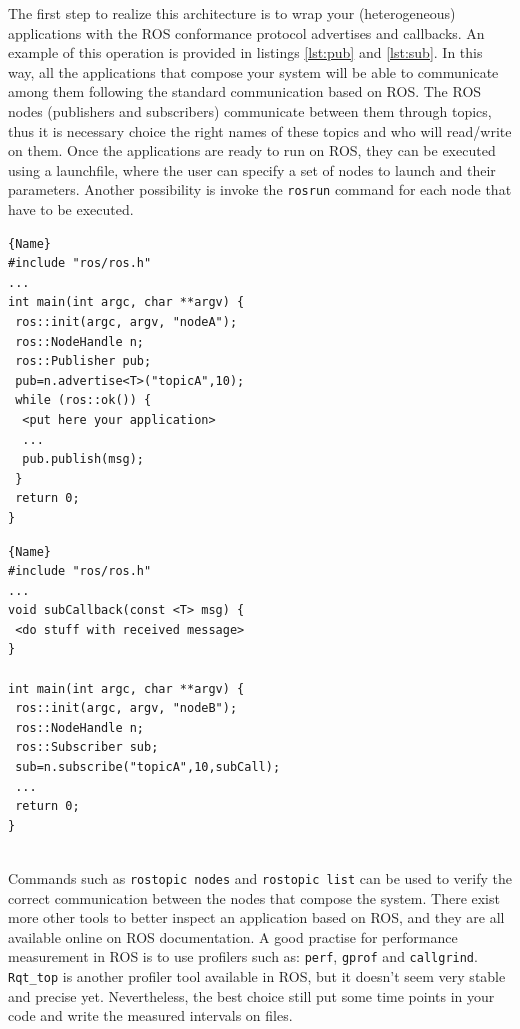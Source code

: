 The first step to realize this architecture is to wrap your (heterogeneous) applications with the ROS conformance protocol advertises and callbacks. An example of this operation is provided in listings \ref{lst:pub} and \ref{lst:sub}.
In this way, all the applications that compose your system will be able to communicate among them following the standard communication based on ROS.
The ROS nodes (publishers and subscribers) communicate between them through topics, thus it is necessary choice the right names of these topics and who will read/write on them.
Once the applications are ready to run on ROS, they can be executed using a launchfile, where the user can specify a set of nodes to launch and their parameters.
Another possibility is invoke the \lstinline{rosrun} command for each node that have to be executed.


\noindent\begin{minipage}{.475\textwidth}
\begin{lstlisting}[numbers=none,caption=Publisher,frame=tlrb, label=lst:pub]{Name}
#include "ros/ros.h"
...
int main(int argc, char **argv) {
 ros::init(argc, argv, "nodeA");
 ros::NodeHandle n;
 ros::Publisher pub;
 pub=n.advertise<T>("topicA",10);
 while (ros::ok()) {
  <put here your application>
  ...
  pub.publish(msg);
 }
 return 0;
}
\end{lstlisting}
\end{minipage}\hfill
\begin{minipage}{.475\textwidth}
\begin{lstlisting}[numbers=none,caption=Subscriber,frame=tlrb,label=lst:sub]{Name}
#include "ros/ros.h"
...
void subCallback(const <T> msg) {
 <do stuff with received message>
}

int main(int argc, char **argv) {
 ros::init(argc, argv, "nodeB");
 ros::NodeHandle n;
 ros::Subscriber sub;
 sub=n.subscribe("topicA",10,subCall);
 ...
 return 0;
}
\end{lstlisting}
\end{minipage}
\\


Commands such as \lstinline{rostopic nodes} and \lstinline{rostopic list} can be used to verify the correct communication between the nodes that compose the system.
There exist more other tools to better inspect an application based on ROS, and they are all available online on ROS documentation.
A good practise for performance measurement in ROS is to use profilers such as: \lstinline{perf}, \lstinline{gprof} and \lstinline{callgrind}. \lstinline{Rqt_top} is another profiler tool available in ROS, but it doesn't seem very stable and precise yet. Nevertheless, the best choice still put some time points in your code and write the measured intervals on files.



